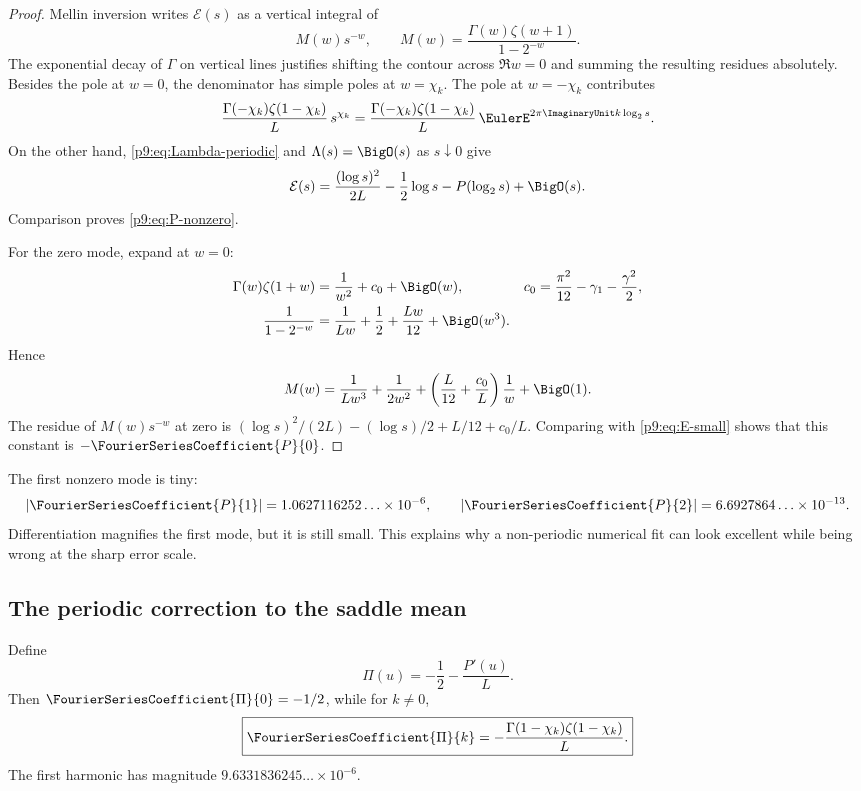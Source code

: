 \documentclass[11pt]{article}
\numberwithin{equation}{section}
\theoremstyle{definition}
\theoremstyle{remark}
\begin{document}
\begin{proof}
Mellin inversion writes $\mathcal E(s)$ as a vertical integral of
\[
 M(w)s^{-w},\qquad M(w)=\frac{\Gamma(w)\zeta(w+1)}{1-2^{-w}}.
\]
The exponential decay of $\Gamma$ on vertical lines justifies shifting the contour across
$\Re w=0$ and summing the resulting residues absolutely.  Besides the pole at $w=0$, the
denominator has simple poles at $w=\chi_k$.
The pole at $w=-\chi_k$ contributes
\[
 \frac{\Gamma(-\chi_k)\zeta(1-\chi_k)}L\,s^{\chi_k}
 =\frac{\Gamma(-\chi_k)\zeta(1-\chi_k)}L\,\EulerE^{2\pi\ImaginaryUnit k\log_2s}.
\]
On the other hand, \eqref{p9:eq:Lambda-periodic} and $\Lambda(s)=\BigO(s)$ as $s\downarrow0$
give
\begin{equation}
 \mathcal E(s)=\frac{(\log s)^2}{2L}-\frac12\log s
 -P(\log_2s)+\BigO(s).                                    \label{p9:eq:E-small}
\end{equation}
Comparison proves \eqref{p9:eq:P-nonzero}.

For the zero mode, expand at $w=0$:
\begin{align*}
 \Gamma(w)\zeta(1+w)
 &=\frac1{w^2}+c_0+\BigO(w),
 &c_0&=\frac{\pi^2}{12}-\gamma_1-\frac{\gamma^2}{2},\\
 \frac1{1-2^{-w}}
 &=\frac1{Lw}+\frac12+\frac{Lw}{12}+\BigO(w^3).
\end{align*}
Hence
\[
 M(w)=\frac1{Lw^3}+\frac1{2w^2}
 +\left(\frac L{12}+\frac{c_0}L\right)\frac1w+\BigO(1).
\]
The residue of $M(w)s^{-w}$ at zero is
$(\log s)^2/(2L)-(\log s)/2+L/12+c_0/L$.  Comparing with
\eqref{p9:eq:E-small} shows that this constant is $-\FourierSeriesCoefficient{P}{0}$.
\end{proof}

\begin{remark}
The first nonzero mode is tiny:
\[
 |\FourierSeriesCoefficient{P}{1}|=1.0627116252\ldots\times10^{-6},\qquad
 |\FourierSeriesCoefficient{P}{2}|=6.6927864\ldots\times10^{-13}.
\]
Differentiation magnifies the first mode, but it is still small.  This explains why a
non-periodic numerical fit can look excellent while being wrong at the sharp error scale.
\end{remark}

\subsection{The periodic correction to the saddle mean}
Define
\begin{equation}
 \Pi(u)=-\frac12-\frac{P'(u)}L.                             \label{p9:eq:Pi}
\end{equation}
Then $\FourierSeriesCoefficient{\Pi}{0}=-1/2$, while for $k\ne0$,
\begin{equation}
 \boxed{
 \FourierSeriesCoefficient{\Pi}{k}=-\frac{\Gamma(1-\chi_k)\zeta(1-\chi_k)}L.} \label{p9:eq:Pi-Fourier}
\end{equation}
The first harmonic has magnitude $9.6331836245\ldots\times10^{-6}$.
\end{document}
